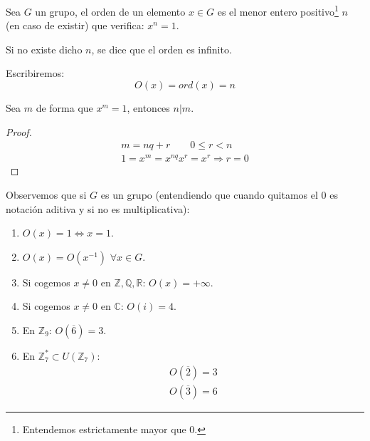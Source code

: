 \begin{definicion}
    Sea $G$ un grupo, el orden de un elemento $x\in G$ es el menor entero positivo\footnote{Entendemos estrictamente mayor que 0.} $n$ (en caso de existir) que verifica: $x^n = 1$.

    Si no existe dicho $n$, se dice que el orden es infinito.

    Escribiremos:
    \begin{equation*}
        O(x) = ord(x) = n
    \end{equation*}
\end{definicion}

\begin{observacion}
    Sea $m$ de forma que $x^m = 1$, entonces $n|m$.
    \begin{proof} %
        \begin{gather*}
            m = nq + r \qquad 0\leq r < n \\
            1 = x^m = x^{nq} x^r = x^r \Longrightarrow r = 0
        \end{gather*}
    \end{proof}
\end{observacion}

\begin{ejemplo}
    Observemos que si $G$ es un grupo (entendiendo que cuando quitamos el 0 es notación aditiva y si no es multiplicativa):
    \begin{enumerate}
        \item $O(x)=1 \Longleftrightarrow x=1$.
        \item $O(x)=O(x^{-1})$ $\forall x\in G$.
        \item Si cogemos $x\neq 0$ en $\mathbb{Z}, \mathbb{Q}, \mathbb{R}$: $O(x)=+\infty$.
        \item Si cogemos $x\neq 0$ en $\mathbb{C}$: $O(i)=4$.
        \item En $\mathbb{Z}_9$: $O(\overline{6}) = 3$.
        \item En $\mathbb{Z}_7^\ast\subset U(\mathbb{Z}_7):$ 
            \begin{gather*}
                O(\overline{2}) = 3 \\
                O(\overline{3}) = 6
            \end{gather*}
    \end{enumerate}
\end{ejemplo}

